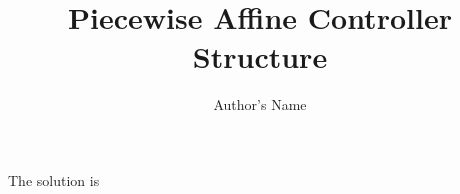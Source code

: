 \documentclass[11pt]{article}
\begin{document}
\title{\bf Piecewise Affine Controller Structure}

\author{Author's Name}

\maketitle

The solution is
\vspace{1cm}
\end{document}
